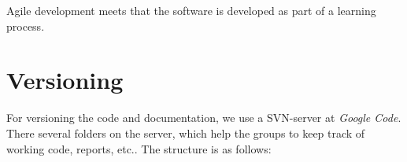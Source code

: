 Agile development meets that the software is developed as part of a learning process.

\section{Versioning}
For versioning the code and documentation, we use a SVN-server at \textit{Google Code}\cite{web:googlecode}.\\

There several folders on the server, which help the groups to keep track of working code, reports, etc.. The structure is as follows:
